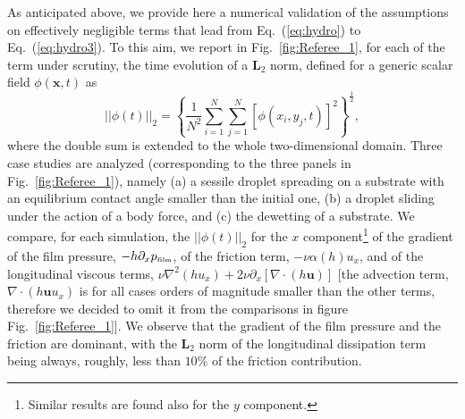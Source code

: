 As anticipated above, we provide here a numerical validation of the assumptions on effectively negligible terms that lead from Eq.~(\ref{eq:hydro}) to Eq.~(\ref{eq:hydro3}). 
To this aim, we report in Fig.~\ref{fig:Referee_1}, for each of the term under scrutiny, the time evolution of a $\mathbf{L}_2$ norm, defined for a generic scalar field $\phi(\mathbf{x},t)$ as 
\begin{equation}\label{eq:magnitude}
  ||\phi(t)||_2 = \left\{\frac{1}{N^2}\sum_{i=1}^{N}\sum_{j=1}^{N}\left[\phi(x_i,y_j,t)\right]^2\right\}^{\frac{1}{2}},
\end{equation}
where the double sum is extended to the whole two-dimensional domain. 
Three case studies are analyzed (corresponding to the three panels in Fig.~\ref{fig:Referee_1}), namely (a) a sessile droplet spreading on a substrate with an equilibrium contact angle smaller than the initial one, (b) a droplet sliding under the action of a body force, and (c) the dewetting of a substrate. 
We compare, for each simulation, the $||\phi(t)||_2$ for the $x$ component\footnote{Similar results are found also for the $y$ component.} of the gradient of the film pressure, $-h\partial_x p_{\mbox{\tiny{film}}}$, of the friction term, $-\nu \alpha(h) u_x$, and of the longitudinal viscous terms, $\nu \nabla^2 (h u_x) + 2\nu \partial_x [\nabla \cdot (h\mathbf{u})]$ [the advection term, $\nabla \cdot (h \mathbf{u}u_x)$ is for all cases orders of magnitude smaller than the other terms, therefore we decided to omit it from the comparisons in figure Fig.~\ref{fig:Referee_1}].
We observe that the gradient of the film pressure and the friction are dominant, with the $\mathbf{L}_2$ norm of the longitudinal dissipation term being always, roughly, less than $10\%$ of the friction contribution.